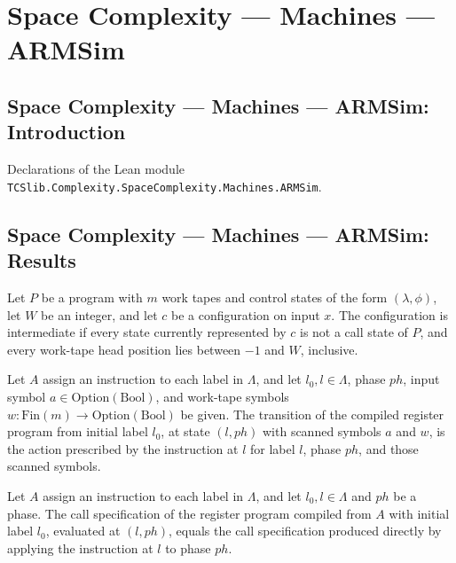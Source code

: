 \section{Space Complexity --- Machines --- ARMSim}
\subsection*{Space Complexity --- Machines --- ARMSim: Introduction}

Declarations of the Lean module \texttt{TCSlib.Complexity.SpaceComplexity.Machines.ARMSim}.

\subsection*{Space Complexity --- Machines --- ARMSim: Results}

\begin{definition}
\label{Complexity.LogProg.Mid}
\leanok
{}
Let $P$ be a program with $m$ work tapes and control states of the form
$(\lambda,\phi)$, let $W$ be an integer, and let $c$ be a configuration on input $x$.
The configuration is intermediate if every state currently represented by $c$ is not a
call state of $P$, and every work-tape head position lies between $-1$ and $W$,
inclusive.
\end{definition}

\begin{lemma}
\label{Complexity.LogProg.armProg_tr}
\leanok
{}
Let $A$ assign an instruction to each label in $\Lambda$, and let $l_0,l\in\Lambda$,
phase $ph$, input symbol $a\in\mathrm{Option}(\mathrm{Bool})$, and work-tape symbols
$w:\mathrm{Fin}(m)\to\mathrm{Option}(\mathrm{Bool})$ be given. The transition of the
compiled register program from initial label $l_0$, at state $(l,ph)$ with scanned
symbols $a$ and $w$, is the action prescribed by the instruction at $l$ for label $l$,
phase $ph$, and those scanned symbols.
\end{lemma}

\begin{lemma}
\label{Complexity.LogProg.armProg_call}
\leanok
{}
Let $A$ assign an instruction to each label in $\Lambda$, and let $l_0,l\in\Lambda$ and
$ph$ be a phase. The call specification of the register program compiled from $A$ with
initial label $l_0$, evaluated at $(l,ph)$, equals the call specification produced
directly by applying the instruction at $l$ to phase $ph$.
\end{lemma}

